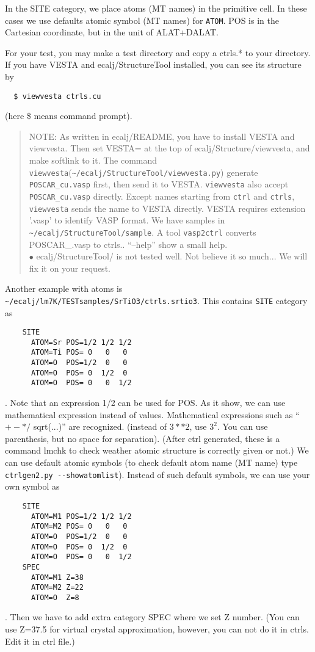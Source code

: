 \documentclass[a4paper,10pt,epsf,fleqn]{article}
\begin{document}
In the SITE category, we place atoms (MT names) in the primitive cell.
In these cases we use defaults atomic symbol (MT names) for \verb+ATOM+.
POS is in the Cartesian coordinate, but in the unit of ALAT+DALAT.

For your test, you may make a test directory and copy a ctrls.* to your directory.
If you have VESTA and ecalj/StructureTool installed, you can see its structure by 
\begin{verbatim}
  $ viewvesta ctrls.cu
\end{verbatim}
(here \$ means command prompt).
\begin{quote}
NOTE: As written in ecalj/README, you have to install VESTA and viewvesta. 
Then set VESTA= at the top of ecalj/Structure/viewvesta, and make softlink to it.
The command \verb+viewvesta+(\verb+~/ecalj/StructureTool/viewvesta.py+)
generate \verb+POSCAR_cu.vasp+ first, then send it to VESTA.
\verb+viewvesta+ also accept \verb+POSCAR_cu.vasp+ directly.
Except names starting from \verb+ctrl+ and \verb+ctrls+,
\verb+viewvesta+ sends the name to VESTA directly. 
VESTA requires extension '.vasp' to identify VASP format.
We have samples in \verb+~/ecalj/StructureTool/sample+.
A tool \verb+vasp2ctrl+ converts POSCAR\_\*.vasp to ctrls.\*.
``--help'' show a small help. \\
$\bullet$ ecalj/StructureTool/ is not tested well. Not believe it so
much... We will fix it on your request.
\end{quote}

Another example with atoms is 
\verb+~/ecalj/lm7K/TESTsamples/SrTiO3/ctrls.srtio3+. This
contains \verb+SITE+ category as
\begin{verbatim}
    SITE
      ATOM=Sr POS=1/2 1/2 1/2
      ATOM=Ti POS= 0   0   0
      ATOM=O  POS=1/2  0   0
      ATOM=O  POS= 0  1/2  0
      ATOM=O  POS= 0   0  1/2
\end{verbatim}
. Note that an expression 1/2 can be used for POS. 
As it show, we can use mathematical expression instead of values.
Mathematical expressions such as ``$+ -  * /$ sqrt(...)'' are recognized.
(instead of $3**2$, use $3^2$. You can use parenthesis, but no space for separation).
(After ctrl generated, these is a command lmchk to check weather atomic
structure is correctly given or not.)
We can use default atomic symbols (to check default atom name (MT name) type \verb+ctrlgen2.py --showatomlist+).
Instead of such default symbols, we can use your own symbol as
\begin{verbatim}
    SITE
      ATOM=M1 POS=1/2 1/2 1/2
      ATOM=M2 POS= 0   0   0
      ATOM=O  POS=1/2  0   0
      ATOM=O  POS= 0  1/2  0
      ATOM=O  POS= 0   0  1/2
    SPEC
      ATOM=M1 Z=38
      ATOM=M2 Z=22
      ATOM=O  Z=8
\end{verbatim}
. Then we have to add extra category SPEC where we set Z number.
(You can use Z=37.5 for virtual crystal approximation, however, 
you can not do it in ctrls. Edit it in ctrl file.)\\
\end{document}
